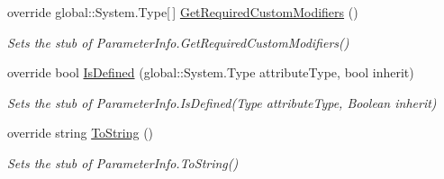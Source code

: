 \begin{DoxyCompactItemize}
override global\-::\-System.\-Type\mbox{[}$\,$\mbox{]} \hyperlink{class_system_1_1_reflection_1_1_fakes_1_1_stub_parameter_info_ac177141b6a02ef71aa8461ff9486018e}{Get\-Required\-Custom\-Modifiers} ()
\begin{DoxyCompactList}\small\item\em Sets the stub of Parameter\-Info.\-Get\-Required\-Custom\-Modifiers()\end{DoxyCompactList}\item 
override bool \hyperlink{class_system_1_1_reflection_1_1_fakes_1_1_stub_parameter_info_ad9cf37b46f653bb266c972471787c6f7}{Is\-Defined} (global\-::\-System.\-Type attribute\-Type, bool inherit)
\begin{DoxyCompactList}\small\item\em Sets the stub of Parameter\-Info.\-Is\-Defined(\-Type attribute\-Type, Boolean inherit)\end{DoxyCompactList}\item 
override string \hyperlink{class_system_1_1_reflection_1_1_fakes_1_1_stub_parameter_info_acdf01751971062817b10caa9c4b82bfe}{To\-String} ()
\begin{DoxyCompactList}\small\item\em Sets the stub of Parameter\-Info.\-To\-String()\end{DoxyCompactList}\end{DoxyCompactItemize}
